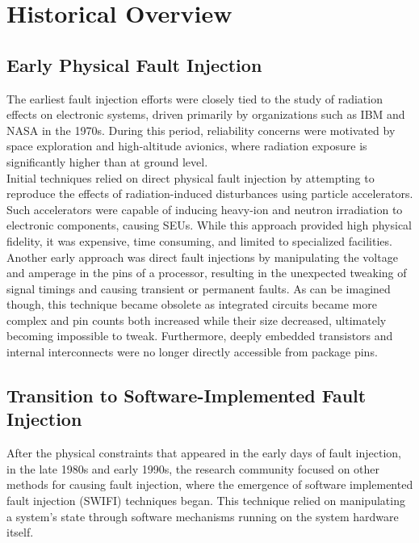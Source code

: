 \section{Historical Overview}

\subsection{Early Physical Fault Injection}
The earliest fault injection efforts were closely tied to the study of radiation effects on electronic systems, driven primarily by organizations such as IBM and NASA in the 1970s. During this period, reliability concerns were motivated by space exploration and high-altitude avionics, where radiation exposure is significantly higher than at ground level.\\

Initial techniques relied on direct physical fault injection by attempting to reproduce the effects of radiation-induced disturbances using particle accelerators. Such accelerators were capable of inducing heavy-ion and neutron irradiation to electronic components, causing SEUs. While this approach provided high physical fidelity, it was expensive, time consuming, and limited to specialized facilities.\\

Another early approach was direct fault injections by manipulating the voltage and amperage in the pins of a processor, resulting in the unexpected tweaking of signal timings and causing transient or permanent faults. As can be imagined though, this technique became obsolete as integrated circuits became more complex and pin counts both increased while their size decreased, ultimately becoming impossible to tweak. Furthermore, deeply embedded transistors and internal interconnects were no longer directly accessible from package pins.

\subsection{Transition to Software-Implemented Fault Injection}
After the physical constraints that appeared in the early days of fault injection, in the late 1980s and early 1990s, the research community focused on other methods for causing fault injection, where the emergence of software implemented fault injection (SWIFI) techniques began. This technique relied on manipulating a system's state through software mechanisms running on the system hardware itself.\\


